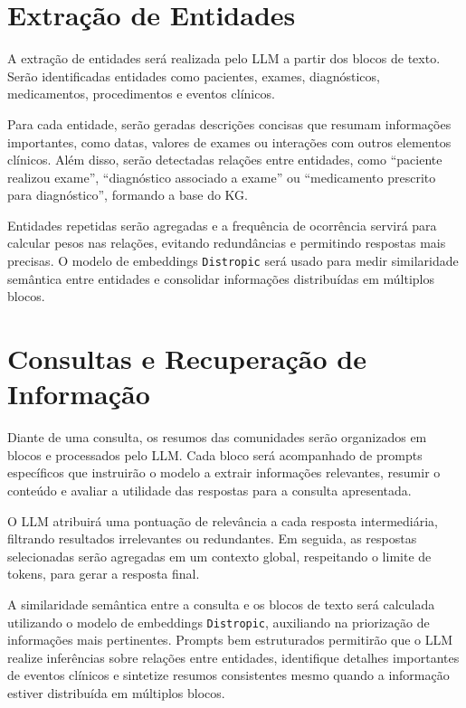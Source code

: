 \section{Extração de Entidades}
A extração de entidades será realizada pelo LLM a partir dos blocos de texto. Serão identificadas entidades como pacientes, exames, diagnósticos, medicamentos, procedimentos e eventos clínicos.

Para cada entidade, serão geradas descrições concisas que resumam informações importantes, como datas, valores de exames ou interações com outros elementos clínicos. Além disso, serão detectadas relações entre entidades, como “paciente realizou exame”, “diagnóstico associado a exame” ou “medicamento prescrito para diagnóstico”, formando a base do KG.

Entidades repetidas serão agregadas e a frequência de ocorrência servirá para calcular pesos nas relações, evitando redundâncias e permitindo respostas mais precisas. O modelo de embeddings \texttt{Distropic} será usado para medir similaridade semântica entre entidades e consolidar informações distribuídas em múltiplos blocos.

\section{Consultas e Recuperação de Informação}
Diante de uma consulta, os resumos das comunidades serão organizados em blocos e processados pelo LLM. Cada bloco será acompanhado de prompts específicos que instruirão o modelo a extrair informações relevantes, resumir o conteúdo e avaliar a utilidade das respostas para a consulta apresentada.  

O LLM atribuirá uma pontuação de relevância a cada resposta intermediária, filtrando resultados irrelevantes ou redundantes. Em seguida, as respostas selecionadas serão agregadas em um contexto global, respeitando o limite de tokens, para gerar a resposta final.  

A similaridade semântica entre a consulta e os blocos de texto será calculada utilizando o modelo de embeddings \texttt{Distropic}, auxiliando na priorização de informações mais pertinentes. Prompts bem estruturados permitirão que o LLM realize inferências sobre relações entre entidades, identifique detalhes importantes de eventos clínicos e sintetize resumos consistentes mesmo quando a informação estiver distribuída em múltiplos blocos.
